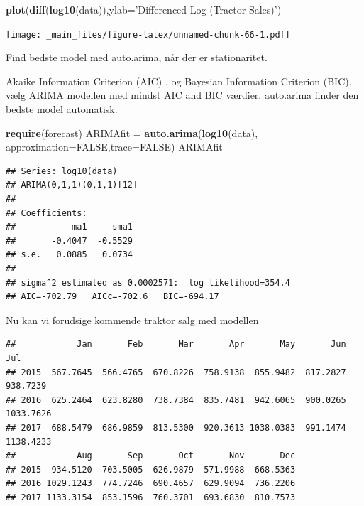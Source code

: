 \documentclass[]{book}
\newenvironment{Shaded}{\begin{snugshade}}{\end{snugshade}}
\newcommand{\DataTypeTok}[1]{\textcolor[rgb]{0.13,0.29,0.53}{#1}}
\newcommand{\DecValTok}[1]{\textcolor[rgb]{0.00,0.00,0.81}{#1}}
\newcommand{\KeywordTok}[1]{\textcolor[rgb]{0.13,0.29,0.53}{\textbf{#1}}}
\newcommand{\NormalTok}[1]{#1}
\newcommand{\OperatorTok}[1]{\textcolor[rgb]{0.81,0.36,0.00}{\textbf{#1}}}
\newcommand{\OtherTok}[1]{\textcolor[rgb]{0.56,0.35,0.01}{#1}}
\newcommand{\StringTok}[1]{\textcolor[rgb]{0.31,0.60,0.02}{#1}}
\begin{document}
\begin{Shaded}
\begin{Highlighting}[]
\KeywordTok{plot}\NormalTok{(}\KeywordTok{diff}\NormalTok{(}\KeywordTok{log10}\NormalTok{(data)),}\DataTypeTok{ylab=}\StringTok{'Differenced Log (Tractor Sales)'}\NormalTok{)}
\end{Highlighting}
\end{Shaded}

\texttt{[image: \_main\_files/figure-latex/unnamed-chunk-66-1.pdf]}

Find bedste model med auto.arima, når der er stationaritet.

Akaike Information Criterion (AIC) , og Bayesian Information Criterion (BIC), vælg ARIMA modellen med mindst AIC and BIC værdier. auto.arima finder den bedste model automatisk.

\begin{Shaded}
\begin{Highlighting}[]
\KeywordTok{require}\NormalTok{(forecast)}
\NormalTok{ARIMAfit =}\StringTok{ }\KeywordTok{auto.arima}\NormalTok{(}\KeywordTok{log10}\NormalTok{(data), }\DataTypeTok{approximation=}\OtherTok{FALSE}\NormalTok{,}\DataTypeTok{trace=}\OtherTok{FALSE}\NormalTok{)}
\NormalTok{ARIMAfit}
\end{Highlighting}
\end{Shaded}

\begin{verbatim}
## Series: log10(data) 
## ARIMA(0,1,1)(0,1,1)[12] 
## 
## Coefficients:
##           ma1     sma1
##       -0.4047  -0.5529
## s.e.   0.0885   0.0734
## 
## sigma^2 estimated as 0.0002571:  log likelihood=354.4
## AIC=-702.79   AICc=-702.6   BIC=-694.17
\end{verbatim}

Nu kan vi forudsige kommende traktor salg med modellen

\begin{Shaded}
\end{Shaded}

\begin{verbatim}
##            Jan       Feb       Mar       Apr       May       Jun       Jul
## 2015  567.7645  566.4765  670.8226  758.9138  855.9482  817.2827  938.7239
## 2016  625.2464  623.8280  738.7384  835.7481  942.6065  900.0265 1033.7626
## 2017  688.5479  686.9859  813.5300  920.3613 1038.0383  991.1474 1138.4233
##            Aug       Sep       Oct       Nov       Dec
## 2015  934.5120  703.5005  626.9879  571.9988  668.5363
## 2016 1029.1243  774.7246  690.4657  629.9094  736.2206
## 2017 1133.3154  853.1596  760.3701  693.6830  810.7573
\end{verbatim}
\end{document}
